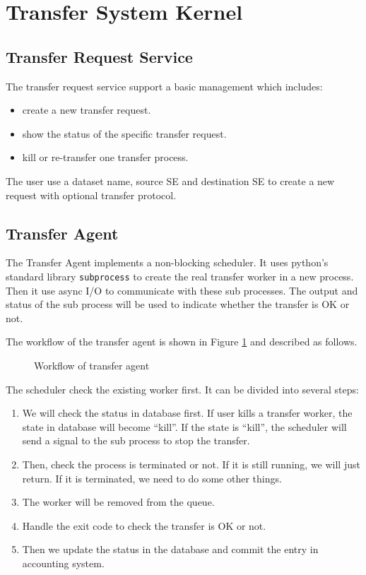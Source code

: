 \section{Transfer System Kernel}

\subsection{Transfer Request Service}

The transfer request service support a basic management which includes:
\begin{itemize}
    \item create a new transfer request.
    \item show the status of the specific transfer request.
    \item kill or re-transfer one transfer process.
\end{itemize}
The user use a dataset name, source SE and destination SE to create a 
new request with optional transfer protocol.

\subsection{Transfer Agent}

The Transfer Agent implements a non-blocking scheduler.
It uses python's standard library {\tt subprocess} to 
create the real transfer worker in a new process.
Then it use async I/O to communicate with these sub processes.
The output and status of the sub process will be used 
to indicate whether the transfer is OK or not.

The workflow of the transfer agent is shown in Figure \ref{fig:agent}
and described as follows.
\begin{figure}
    
    \caption{Workflow of transfer agent} \label{fig:agent}
\end{figure}

The scheduler check the existing worker first.
It can be divided into several steps:
\begin{enumerate}
    \item We will check the status in database first.
          If user kills a transfer worker, the state in
          database will become ``kill''.
          If the state is ``kill'', the scheduler will
          send a signal to the sub process to stop the
          transfer.
    \item Then, check the process is terminated or not.
          If it is still running, we will just return.
          If it is terminated, we need to do some other things.
    \item The worker will be removed from the queue.
    \item Handle the exit code to check the transfer is OK or not.
    \item Then we update the status in the database 
          and commit the entry in accounting system.
\end{enumerate}

